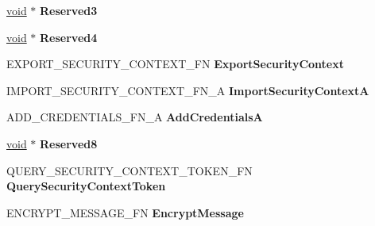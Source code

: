 \begin{DoxyCompactItemize}
\hyperlink{interfacevoid}{void} $\ast$ {\bfseries Reserved3}
\item 
\mbox{\label{struct___s_e_c_u_r_i_t_y___f_u_n_c_t_i_o_n___t_a_b_l_e___a_a34c660845610ed16848d34b19f1e9b0e}} 
\hyperlink{interfacevoid}{void} $\ast$ {\bfseries Reserved4}
\item 
\mbox{\label{struct___s_e_c_u_r_i_t_y___f_u_n_c_t_i_o_n___t_a_b_l_e___a_a50e1aff03479aa8f2fba6db531ff8a24}} 
E\+X\+P\+O\+R\+T\+\_\+\+S\+E\+C\+U\+R\+I\+T\+Y\+\_\+\+C\+O\+N\+T\+E\+X\+T\+\_\+\+FN {\bfseries Export\+Security\+Context}
\item 
\mbox{\label{struct___s_e_c_u_r_i_t_y___f_u_n_c_t_i_o_n___t_a_b_l_e___a_a51ca584945613e5ccc33870fd459c315}} 
I\+M\+P\+O\+R\+T\+\_\+\+S\+E\+C\+U\+R\+I\+T\+Y\+\_\+\+C\+O\+N\+T\+E\+X\+T\+\_\+\+F\+N\+\_\+A {\bfseries Import\+Security\+ContextA}
\item 
\mbox{\label{struct___s_e_c_u_r_i_t_y___f_u_n_c_t_i_o_n___t_a_b_l_e___a_ab901b2c41351b97f3527b460410738fb}} 
A\+D\+D\+\_\+\+C\+R\+E\+D\+E\+N\+T\+I\+A\+L\+S\+\_\+\+F\+N\+\_\+A {\bfseries Add\+CredentialsA}
\item 
\mbox{\label{struct___s_e_c_u_r_i_t_y___f_u_n_c_t_i_o_n___t_a_b_l_e___a_a614f5ad343732759fee9117d2bee61f0}} 
\hyperlink{interfacevoid}{void} $\ast$ {\bfseries Reserved8}
\item 
\mbox{\label{struct___s_e_c_u_r_i_t_y___f_u_n_c_t_i_o_n___t_a_b_l_e___a_a43d3411683f9e2889c7bf201fc895336}} 
Q\+U\+E\+R\+Y\+\_\+\+S\+E\+C\+U\+R\+I\+T\+Y\+\_\+\+C\+O\+N\+T\+E\+X\+T\+\_\+\+T\+O\+K\+E\+N\+\_\+\+FN {\bfseries Query\+Security\+Context\+Token}
\item 
\mbox{\label{struct___s_e_c_u_r_i_t_y___f_u_n_c_t_i_o_n___t_a_b_l_e___a_a5c290d47edc341805f942230a0623bc2}} 
E\+N\+C\+R\+Y\+P\+T\+\_\+\+M\+E\+S\+S\+A\+G\+E\+\_\+\+FN {\bfseries Encrypt\+Message}
\item 

\end{DoxyCompactItemize}
